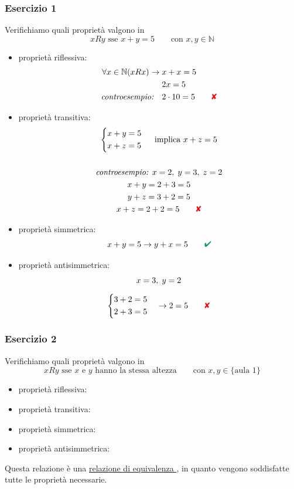 \documentclass[italian]{article}
\newcommand{\crossmark}{\textcolor{red}{\text{$\qquad$\ding{56}}}}
\renewcommand{\checkmark}{\textcolor{ForestGreen}{\text{$\qquad$\ding{52}}}}
\newcommand{\ins}[1]{\text{$\mathbb{#1}$}}
\begin{document}
\subsubsection{Esercizio 1}
Verifichiamo quali proprietà valgono in
\[
	xRy \text{ sse } x+y=5 \qquad \text{con } x,y \in \ins{N}
\]
\begin{itemize}
	\item proprietà riflessiva:
	\begin{gather*}
		\begin{split}
			\forall x \in \ins{N}(xRx) \to \; & x+ x = 5 \\
			& 2x = 5 \\
			\textit{controesempio:}\quad & 2\cdot 10 = 5 \crossmark
		\end{split}
	\end{gather*}
	
	\item proprietà transitiva: 
		\begin{gather*}
			\begin{cases*}
				x + y = 5 \\
				x + z = 5
			\end{cases*}
			\quad \text{ implica }  x+z = 5 \\\\
			\textit{controesempio: } x=2,\; y=3,\; z=2 \\
			x + y = 2 + 3 = 5 \\
			y + z = 3 + 2 = 5 \\
			x + z = 2 + 2 = 5 \crossmark
		\end{gather*}
	\item proprietà simmetrica:
		\[
			x + y = 5 \to y + x = 5 \checkmark
		\] 
	\item proprietà antisimmetrica:
		\begin{gather*}
			x=3, \; y=2 \\[2mm]
			\begin{cases*}
				3 + 2 = 5 \\
				2 + 3 = 5
			\end{cases*}
			\quad \to 2=5 \crossmark
		\end{gather*}
\end{itemize}

\subsubsection{Esercizio 2}
Verifichiamo quali proprietà valgono in
\[
	xRy \text{ sse } x \text{ e } y \text{ hanno la stessa altezza} \qquad \text{con }x,y \in \{\text{aula 1}\}
\]
\begin{itemize}
	\item proprietà riflessiva: \checkmark
	\item proprietà transitiva: \checkmark
	\item proprietà simmetrica: \checkmark
	\item proprietà antisimmetrica: \crossmark
\end{itemize}
Questa relazione è una \underline{relazione di equivalenza }, in quanto vengono soddisfatte tutte le proprietà necessarie.
\end{document}
